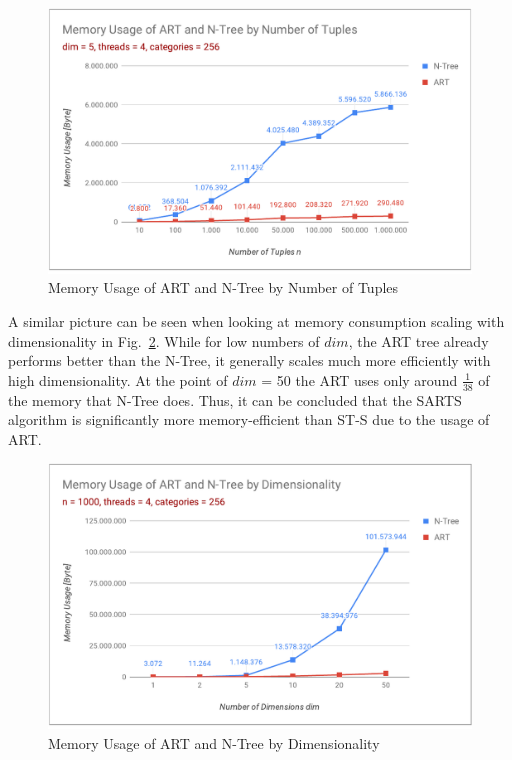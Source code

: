 \begin{figure}[h]
	\centering
	\includegraphics[width=1\linewidth]{figures/memory-usage-n}
	\caption{Memory Usage of ART and N-Tree by Number of Tuples}
	\label{fig:memory-usage-n}
\end{figure}

A similar picture can be seen when looking at memory consumption scaling with dimensionality in Fig.~\ref{fig:memory-usage-dim}. While for low numbers of $dim$, the ART tree already performs better than the N-Tree, it generally scales much more efficiently with high dimensionality. At the point of $dim$ = 50 the ART uses only around $\frac{1}{38}$ of the memory that N-Tree does. Thus, it can be concluded that the SARTS algorithm is significantly more memory-efficient than ST-S due to the usage of ART. 

\begin{figure}[h]
	\centering
	\includegraphics[width=1\linewidth]{figures/memory-usage-dim}
	\caption{Memory Usage of ART and N-Tree by Dimensionality}
	\label{fig:memory-usage-dim}
\end{figure}



